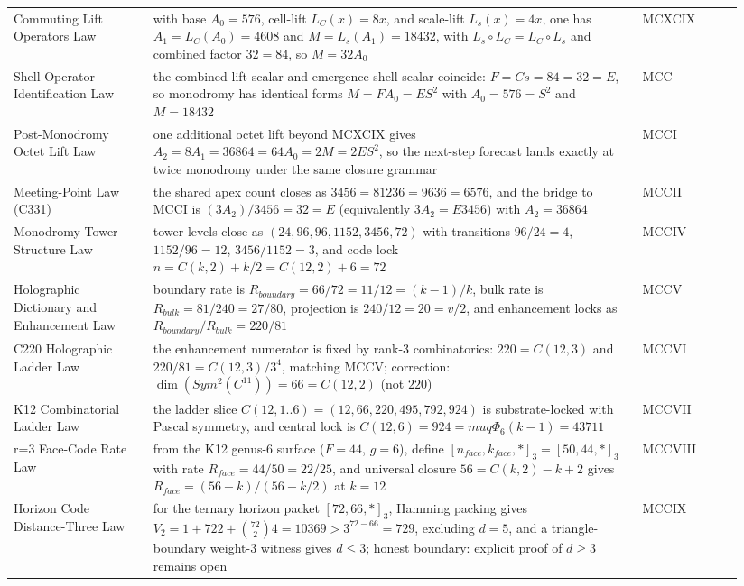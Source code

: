 \documentclass[11pt]{article}
\def\mathbb#1{#1}%
\def\mathrm#1{#1}%
\def\mu{mu}%
\def\Phi#1{Phi#1}%
\def\cdot{ }%
\begin{document}
{\begin{longtable}{>{\raggedright\arraybackslash}p{0.18\linewidth} >{\raggedright\arraybackslash}p{0.63\linewidth} >{\raggedright\arraybackslash}p{0.13\linewidth}}
Commuting Lift Operators Law & with base $A_0=576$, cell-lift $L_C(x)=8x$, and scale-lift $L_s(x)=4x$, one has $A_1=L_C(A_0)=4608$ and $M=L_s(A_1)=18432$, with $L_s\circ L_C = L_C\circ L_s$ and combined factor $32=8\cdot4$, so $M=32A_0$ & MCXCIX \\
Shell-Operator Identification Law & the combined lift scalar and emergence shell scalar coincide: $F=C\cdot s=8\cdot4=32=E$, so monodromy has identical forms $M=F\cdot A_0=E\cdot S^2$ with $A_0=576=S^2$ and $M=18432$ & MCC \\
Post-Monodromy Octet Lift Law & one additional octet lift beyond MCXCIX gives $A_2=8A_1=36864=64A_0=2M=2E\cdot S^2$, so the next-step forecast lands exactly at twice monodromy under the same closure grammar & MCCI \\
Meeting-Point Law (C331) & the shared apex count closes as $3456=8\cdot12\cdot36=96\cdot36=6\cdot576$, and the bridge to MCCI is $(3A_2)/3456=32=E$ (equivalently $3A_2=E\cdot3456$) with $A_2=36864$ & MCCII \\
Monodromy Tower Structure Law & tower levels close as $(24,96,96,1152,3456,72)$ with transitions $96/24=4$, $1152/96=12$, $3456/1152=3$, and code lock $n=C(k,2)+k/2=C(12,2)+6=72$ & MCCIV \\
Holographic Dictionary and Enhancement Law & boundary rate is $R_{\mathrm{boundary}}=66/72=11/12=(k-1)/k$, bulk rate is $R_{\mathrm{bulk}}=81/240=27/80$, projection is $240/12=20=v/2$, and enhancement locks as $R_{\mathrm{boundary}}/R_{\mathrm{bulk}}=220/81$ & MCCV \\
C220 Holographic Ladder Law & the enhancement numerator is fixed by rank-3 combinatorics: $220=C(12,3)$ and $220/81=C(12,3)/3^4$, matching MCCV; correction: $\dim(\mathrm{Sym}^2(\mathbb{C}^{11}))=66=C(12,2)$ (not $220$) & MCCVI \\
K12 Combinatorial Ladder Law & the ladder slice $C(12,1..6)=(12,66,220,495,792,924)$ is substrate-locked with Pascal symmetry, and central lock is $C(12,6)=924=\mu\cdot q\cdot\Phi_6\cdot(k-1)=4\cdot3\cdot7\cdot11$ & MCCVII \\
r=3 Face-Code Rate Law & from the K12 genus-6 surface ($F=44$, $g=6$), define $[n_{\mathrm{face}},k_{\mathrm{face}},*]_3=[50,44,*]_3$ with rate $R_{\mathrm{face}}=44/50=22/25$, and universal closure $56=C(k,2)-k+2$ gives $R_{\mathrm{face}}=(56-k)/(56-k/2)$ at $k=12$ & MCCVIII \\
Horizon Code Distance-Three Law & for the ternary horizon packet $[72,66,*]_3$, Hamming packing gives $V_2=1+72\cdot2+\binom{72}{2}\cdot4=10369>3^{72-66}=729$, excluding $d=5$, and a triangle-boundary weight-3 witness gives $d\le3$; honest boundary: explicit proof of $d\ge3$ remains open & MCCIX \\

\end{longtable}}
\end{document}
